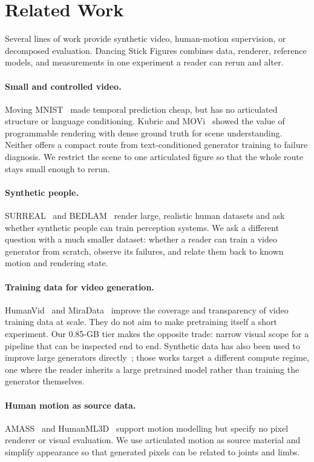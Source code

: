 \documentclass[10pt,twocolumn]{article}
\begin{document}
\section{Related Work}
Several lines of work provide synthetic video, human-motion supervision, or decomposed evaluation. Dancing
Stick Figures combines data, renderer, reference models, and measurements in one experiment a reader can rerun
and alter.

\paragraph{Small and controlled video.} Moving MNIST~\cite{srivastava2015unsupervised} made temporal prediction
cheap, but has no articulated structure or language conditioning. Kubric and MOVi~\cite{greff2022kubric} showed
the value of programmable rendering with dense ground truth for scene understanding. Neither offers a compact
route from text-conditioned generator training to failure diagnosis. We restrict the scene to one articulated
figure so that the whole route stays small enough to rerun.

\paragraph{Synthetic people.} SURREAL~\cite{varol2017surreal} and BEDLAM~\cite{black2023bedlam} render large,
realistic human datasets and ask whether synthetic people can train perception systems. We ask a different
question with a much smaller dataset: whether a reader can train a video generator from scratch, observe its
failures, and relate them back to known motion and rendering state.

\paragraph{Training data for video generation.} HumanVid~\cite{wang2024humanvid} and
MiraData~\cite{ju2024miradata} improve the coverage and transparency of video training data at scale. They do
not aim to make pretraining itself a short experiment. Our 0.85-GB tier makes the opposite trade: narrow visual
scope for a pipeline that can be inspected end to end. Synthetic data has also been used to improve large
generators directly~\cite{zhao2025synthetic,jin2026dynavid}; those works target a different compute regime, one
where the reader inherits a large pretrained model rather than training the generator themselves.

\paragraph{Human motion as source data.} AMASS~\cite{mahmood2019amass} and HumanML3D~\cite{guo2022humanml3d}
support motion modelling but specify no pixel renderer or visual evaluation. We use articulated motion as
source material and simplify appearance so that generated pixels can be related to joints and limbs.
\end{document}
